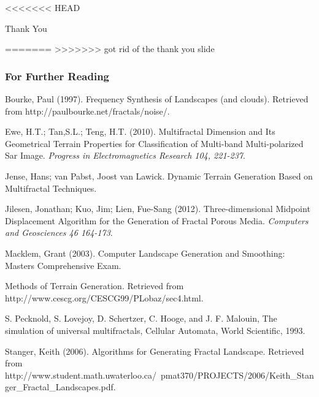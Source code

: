 \documentclass{beamer}
\begin{document}
<<<<<<< HEAD



\begin{frame}
 Thank You
\end{frame}


=======
>>>>>>> got rid of the thank you slide

\begin{frame}[shrink=30]
  \frametitle{For Further Reading}
  
Bourke, Paul (1997). Frequency Synthesis of Landscapes (and clouds). Retrieved from http://paulbourke.net/fractals/noise/.
 
 Ewe, H.T.; Tan,S.L.; Teng, H.T. (2010). Multifractal Dimension and Its Geometrical Terrain Properties for Classification of Multi-band Multi-polarized Sar Image. \emph{Progress in Electromagnetics Research 104, 221-237}.
 
 Jense, Hans; van Pabst, Joost van Lawick. Dynamic Terrain Generation Based on Multifractal Techniques. 
 
 Jilesen, Jonathan; Kuo, Jim; Lien, Fue-Sang (2012). Three-dimensional Midpoint Displacement Algorithm for the Generation of Fractal Porous Media. \emph{Computers and Geosciences 46 164-173}.
 
 Macklem, Grant (2003). Computer Landscape Generation and Smoothing: Masters Comprehensive Exam.
   
Methods of Terrain Generation. Retrieved from http://www.cescg.org/CESCG99/PLobaz/sec4.html.

S. Pecknold, S. Lovejoy, D. Schertzer, C. Hooge, and J. F. Malouin, The simulation of universal multifractals, Cellular Automata, World Scientific, 1993.

Stanger, Keith (2006). Algorithms for Generating Fractal Landscape. Retrieved from http://www.student.math.uwaterloo.ca/~pmat370/PROJECTS/2006/Keith_Stanger_Fractal_Landscapes.pdf.


   
    
    

\end{frame}
\end{document}
